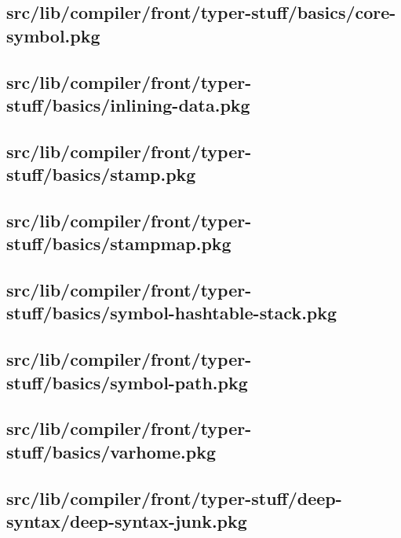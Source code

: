 \subsection{src/lib/compiler/front/typer-stuff/basics/core-symbol.pkg}


\subsection{src/lib/compiler/front/typer-stuff/basics/inlining-data.pkg}


\subsection{src/lib/compiler/front/typer-stuff/basics/stamp.pkg}


\subsection{src/lib/compiler/front/typer-stuff/basics/stampmap.pkg}


\subsection{src/lib/compiler/front/typer-stuff/basics/symbol-hashtable-stack.pkg}


\subsection{src/lib/compiler/front/typer-stuff/basics/symbol-path.pkg}


\subsection{src/lib/compiler/front/typer-stuff/basics/varhome.pkg}


\subsection{src/lib/compiler/front/typer-stuff/deep-syntax/deep-syntax-junk.pkg}


